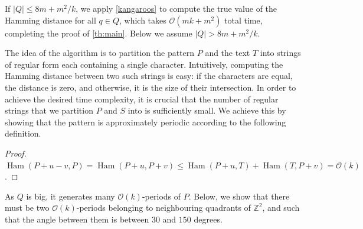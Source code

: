 \documentclass[a4paper,11pt]{article}
\newcommand{\Z}{\mathbb{Z}}
\renewcommand{\O}{\mathcal{O}}
\DeclareMathOperator*{\Ham}{Ham}
\newcommand{\absolute}[1]{\left\lvert#1\right\rvert}
\begin{document}
If $\absolute{Q} \le 8m + m^2/k$, we apply \cref{kangaroos} to compute the true value of the Hamming distance for all $q \in Q$, which takes $\O(mk+m^2)$ total time, completing the proof of \cref{th:main}. Below we assume $\absolute{Q} > 8m + m^2/k$. 

The idea of the algorithm is to partition the pattern $P$ and the text $T$ into strings of regular form each containing a single character. Intuitively, computing the Hamming distance between two such strings is easy: if the characters are equal, the distance is zero, and otherwise, it is the size of their intersection.
In order to achieve the desired time complexity, it is crucial that the number of regular strings that we partition $P$ and $S$ into is sufficiently small.
We achieve this by showing that the pattern is approximately periodic according to the following definition.

\restateDefTwoDApproxPeriod
\restateClaimPeriodicity
\begin{proof}
$\Ham(P + u - v, P) = \Ham(P + u, P + v) \le \Ham(P + u, T) + \Ham(T,P + v) = \O(k)$.
\end{proof}

As $Q$ is big, it generates many $\O(k)$-periods of $P$. Below, we show that there must be two $\O(k)$-periods belonging to neighbouring quadrants of $\Z^2$, and such that the angle between them is between $30$ and $150$ degrees.
\end{document}
